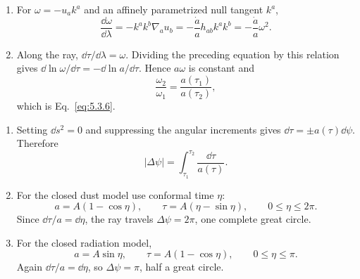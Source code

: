 \begin{enumerate}[leftmargin=2.8em,itemsep=1.2em]
\begin{enumerate}[label=\alph*),leftmargin=2em]
\item For \(\omega=-u_ak^a\) and an affinely parametrized null tangent
\(k^a\),
\[
 \frac{\dd\omega}{\dd\lambda}
 =-k^ak^b\nabla_au_b
 =-\frac{\dot a}{a}h_{ab}k^ak^b
 =-\frac{\dot a}{a}\omega^2.
\]

\item Along the ray, \(\dd\tau/\dd\lambda=\omega\).  Dividing the preceding
equation by this relation gives
\(\dd\ln\omega/\dd\tau=-\dd\ln a/\dd\tau\).  Hence
\(a\omega\) is constant and
\[
 \frac{\omega_2}{\omega_1}=\frac{a(\tau_1)}{a(\tau_2)},
\]
which is Eq.~\eqref{eq:5.3.6}.
\end{enumerate}

\begin{enumerate}[label=\alph*),leftmargin=2em]
\item Setting \(\dd s^2=0\) and suppressing the angular increments gives
\(\dd\tau=\pm a(\tau)\dd\psi\).  Therefore
\[
 |\Delta\psi|=\int_{\tau_1}^{\tau_2}\frac{\dd\tau}{a(\tau)}.
\]

\item For the closed dust model use conformal time \(\eta\):
\[
 a=A(1-\cos\eta),\qquad
 \tau=A(\eta-\sin\eta),\qquad 0\leq\eta\leq2\pi.
\]
Since \(\dd\tau/a=\dd\eta\), the ray travels
\(\Delta\psi=2\pi\), one complete great circle.

\item For the closed radiation model,
\[
 a=A\sin\eta,\qquad
 \tau=A(1-\cos\eta),\qquad 0\leq\eta\leq\pi.
\]
Again \(\dd\tau/a=\dd\eta\), so \(\Delta\psi=\pi\), half a great circle.
\end{enumerate}
\end{enumerate}
